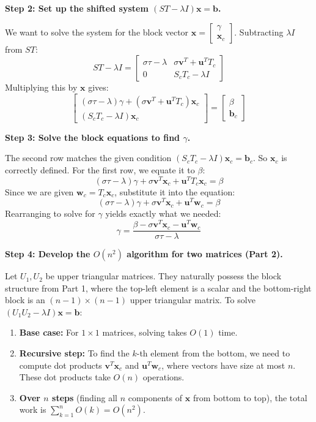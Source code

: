 \begin{solution}
\textbf{Step 2: Set up the shifted system $(ST - \lambda I)\mathbf{x} = \mathbf{b}$.}

We want to solve the system for the block vector $\mathbf{x} = \begin{bmatrix} \gamma \\ \mathbf{x}_c \end{bmatrix}$. Subtracting $\lambda I$ from $ST$:
\[ ST - \lambda I = \begin{bmatrix} \sigma \tau - \lambda & \sigma \mathbf{v}^T + \mathbf{u}^T T_c \\ 0 & S_c T_c - \lambda I \end{bmatrix} \]
Multiplying this by $\mathbf{x}$ gives:
\[ \begin{bmatrix} (\sigma \tau - \lambda) \gamma + (\sigma \mathbf{v}^T + \mathbf{u}^T T_c) \mathbf{x}_c \\ (S_c T_c - \lambda I) \mathbf{x}_c \end{bmatrix} = \begin{bmatrix} \beta \\ \mathbf{b}_c \end{bmatrix} \]

\textbf{Step 3: Solve the block equations to find $\gamma$.}

The second row matches the given condition $(S_c T_c - \lambda I)\mathbf{x}_c = \mathbf{b}_c$. So $\mathbf{x}_c$ is correctly defined.
For the first row, we equate it to $\beta$:
\[ (\sigma \tau - \lambda) \gamma + \sigma \mathbf{v}^T \mathbf{x}_c + \mathbf{u}^T T_c \mathbf{x}_c = \beta \]
Since we are given $\mathbf{w}_c = T_c \mathbf{x}_c$, substitute it into the equation:
\[ (\sigma \tau - \lambda) \gamma + \sigma \mathbf{v}^T \mathbf{x}_c + \mathbf{u}^T \mathbf{w}_c = \beta \]
Rearranging to solve for $\gamma$ yields exactly what we needed:
\[ \gamma = \frac{\beta - \sigma \mathbf{v}^T \mathbf{x}_c - \mathbf{u}^T \mathbf{w}_c}{\sigma \tau - \lambda} \]

\textbf{Step 4: Develop the $O(n^2)$ algorithm for two matrices (Part 2).}

Let $U_1, U_2$ be upper triangular matrices. They naturally possess the block structure from Part 1, where the top-left element is a scalar and the bottom-right block is an $(n-1) \times (n-1)$ upper triangular matrix.
To solve $(U_1 U_2 - \lambda I)\mathbf{x} = \mathbf{b}$:
\begin{enumerate}
    \item \textbf{Base case:} For $1 \times 1$ matrices, solving takes $O(1)$ time.
    \item \textbf{Recursive step:} To find the $k$-th element from the bottom, we need to compute dot products $\mathbf{v}^T \mathbf{x}_c$ and $\mathbf{u}^T \mathbf{w}_c$, where vectors have size at most $n$. These dot products take $O(n)$ operations.
    \item \textbf{Over $n$ steps} (finding all $n$ components of $\mathbf{x}$ from bottom to top), the total work is $\sum_{k=1}^n O(k) = O(n^2)$.
\end{enumerate} 


\end{solution}
